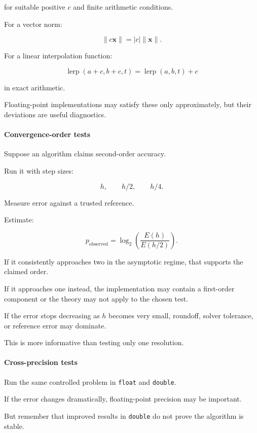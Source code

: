 for suitable positive \(c\) and finite arithmetic conditions.

For a vector norm:

\[ \boxed{ \|c\mathbf x\|=|c|\|\mathbf x\| }. \]

For a linear interpolation function:

\[ \boxed{ \operatorname{lerp}(a+c,b+c,t) = \operatorname{lerp}(a,b,t)+c } \]

in exact arithmetic.

Floating-point implementations may satisfy these only approximately, but their deviations are useful diagnostics.

\paragraph{Convergence-order tests}\label{convergence-order-tests}

Suppose an algorithm claims second-order accuracy.

Run it with step sizes:

\[ h,\qquad h/2,\qquad h/4. \]

Measure error against a trusted reference.

Estimate:

\[ p_{\mathrm{observed}} = \log_2 \left( \frac{E(h)}{E(h/2)} \right). \]

If it consistently approaches two in the asymptotic regime, that supports the claimed order.

If it approaches one instead, the implementation may contain a first-order component or the theory may not apply to the chosen test.

If the error stops decreasing as \(h\) becomes very small, roundoff, solver tolerance, or reference error may dominate.

This is more informative than testing only one resolution.

\paragraph{Cross-precision tests}\label{cross-precision-tests}

Run the same controlled problem in \texttt{float} and \texttt{double}.

If the error changes dramatically, floating-point precision may be important.

But remember that improved results in \texttt{double} do not prove the algorithm is stable.

